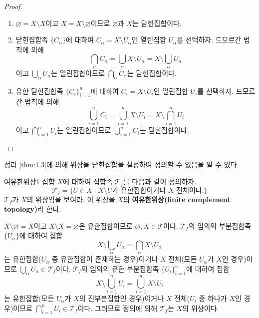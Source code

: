 \documentclass{article}
\begin{document}
\begin{proof}
  \phantom{}
  \begin{enumerate}[(1)]
    \item $\varnothing=X\setminus X$이고 $X=X\setminus\varnothing$이므로 $\varnothing$과 $X$는 닫힌집합이다.
    \item 닫힌집합족 $\{C_\alpha\}$에 대하여 $C_\alpha=X\setminus U_\alpha$인 열린집합 $U_\alpha$를 선택하자. 드모르간 법칙에 의해
      \[
        \bigcap_\alpha C_\alpha=\bigcup_\alpha X\setminus U_\alpha=X\setminus\bigcup_\alpha U_\alpha
      \]
      이고 $\bigcup_\alpha U_\alpha$는 열린집합이므로 $\bigcap_\alpha C_\alpha$는 닫힌집합이다.
    \item 유한 닫힌집합족 $\{C_i\}_{i=1}^n$에 대하여 $C_i=X\setminus U_i$인 열린집합 $U_i$를 선택하자. 드모르간 법칙에 의해
      \[
        \bigcup_{i=1}^nC_i=\bigcup_{i=1}^n X\setminus U_i=X\setminus\bigcap_{i=1}^nU_i
      \]
      이고 $\bigcap_{i=1}^nU_i$는 열린집합이므로 $\bigcup_{i=1}^nC_i$는 닫힌집합이다.\qedhere
  \end{enumerate}
\end{proof}

\begin{remark}
  정리 \ref{thm:1.3}에 의해 위상을 닫힌집합을 설정하여 정의할 수 있음을 알 수 있다.
\end{remark}

\begin{prob}{여유한위상}{1}
  집합 $X$에 대하여 집합족 ${\mathcal T}_f$를 다음과 같이 정의하자.
  \[
    {\mathcal T}_f=\{U\in X\mid X\setminus U\text{가 유한집합이거나 }X\text{ 전체이다.}\}
  \]
  ${\mathcal T}_f$가 $X$의 위상임을 보여라. 이 위상을 $X$의 \textbf{여유한위상(finite complement topology)}라 한다.
\end{prob}

\begin{sol}
  $X\setminus\varnothing=X$이고 $X\setminus X=\varnothing$은 유한집합이므로 $\varnothing,X\in{\mathcal T}$이다. ${\mathcal T}_f$의 임의의 부분집합족 $\{U_\alpha\}$에 대하여 집합
  \[
    X\setminus\bigcup_\alpha U_\alpha=\bigcap_\alpha X\setminus U_\alpha
  \]
  는 유한집합($U_\alpha$ 중 유한집합이 존재하는 경우)이거나 $X$ 전체(모든 $U_\alpha$가 $X$인 경우)이므로 $\bigcup_\alpha U_\alpha\in{\mathcal T}_f$이다. ${\mathcal T}_f$의 임의의 유한 부분집합족 $\{U_i\}_{i=1}^n$에 대하여 집합
  \[
    X\setminus\bigcup_{i=1}^nU_i=\bigcup_{i=1}^nX\setminus U_i
  \]
  는 유한집합(모든 $U_\alpha$가 $X$의 진부분집합인 경우)이거나 $X$ 전체($U_i$ 중 하나가 $X$인 경우)이므로 $\bigcap_{i=1}^nU_i\in{\mathcal T}_f$이다. 그러므로 정의에 의해 ${\mathcal T}_f$는 $X$의 위상이다.
\end{sol}
\end{document}
